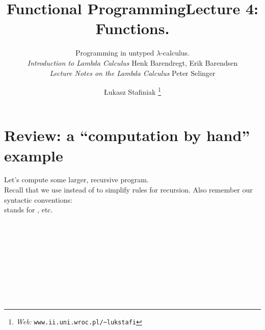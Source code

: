 \documentclass{beamer}
\newcommand{\tmem}[1]{{\em #1\/}}
\newcommand{\tmfnhomepage}[1]{\thanks{\textit{Web:} \texttt{#1}}}
\newcommand{\tmverbatim}[1]{\text{{\ttfamily{#1}}}}
\begin{document}
\title{Functional Programming}

\author{
  {\L}ukasz Stafiniak
  \tmfnhomepage{www.ii.uni.wroc.pl/\~{}lukstafi}
}


\maketitle

\title{Lecture 4: Functions.}

\subtitle{Programming in untyped $\lambda$-calculus.\\
{\small{{\tmem{Introduction to Lambda Calculus}} Henk Barendregt, Erik
Barendsen\\
{\tmem{Lecture Notes on the Lambda Calculus}} Peter Selinger}}}

\maketitle

{\newpage}

\section{Review: a ``computation by hand'' example}

Let's compute some larger, recursive program.\\
Recall that we use {} instead of {} to simplify
rules for recursion. Also remember our syntactic conventions:\\
\tmverbatim{fun x y -> e} stands for \tmverbatim{fun x -> (fun y -> e)}, etc.

{}{}{\hlopt{= }}{}{\hlopt{(}}{}{}{\hlopt{)
}}{}{}\\
{}{}{\hlopt{= }}{}{\hlopt{\textbar }}{}{}{}{\hlopt{*
}}{}{\hlendline{}}\\
{}\\
{}{}{\hlopt{=}}{\hlendline{}}\\
{\hlstd{ \ }}{}{\hlopt{(}}{}{}{\hlopt{->}}{\hlendline{}}\\
{\hlstd{ \ \ \ }}{}{}{}{\hlendline{}}\\
{\hlstd{ \ \ \ \ \ }}{\hlopt{\textbar }}{}{\hlopt{->
}}{}{\hlendline{}}\\
{\hlstd{ \ \ \ \ \ }}{\hlopt{\textbar }}{}{\hlopt{(}}{}{\hlopt{, }}{}{\hlopt{) -> }}{}{\hlopt{+ }}{}{\hlopt{) }}{}{\hlendline{}}\\
{}{\hlopt{(}}{}{\hlopt{(}}{}{\hlopt{,
(}}{}{\hlopt{(}}{}{\hlopt{,
}}{}{\hlopt{))))}}{\hlendline{}}{\newpage}
\end{document}
